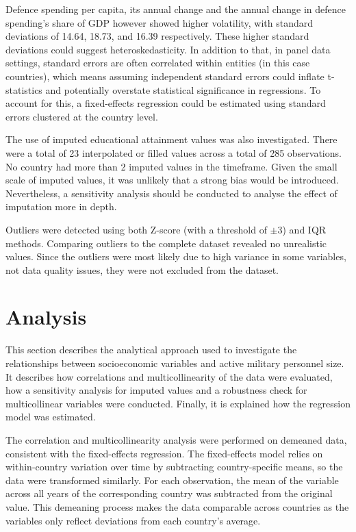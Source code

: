 Defence spending per capita, its annual change and the annual change in defence spending's 
share of GDP however showed higher volatility, with standard deviations of 14.64, 18.73, and 
16.39 respectively. These higher standard deviations could suggest heteroskedasticity. In addition 
to that, in panel data settings, standard errors are often correlated within entities (in this case countries), 
which means assuming independent standard errors could inflate t-statistics and potentially 
overstate statistical significance in regressions. To account for this, a fixed-effects 
regression could be estimated using standard errors clustered at the country level.

The use of imputed educational attainment values was also investigated. There were a total 
of 23 interpolated or filled values across a total of 285 observations. No country had
more than 2 imputed values in the timeframe. Given the small scale of imputed values, it was 
unlikely that a strong bias would be introduced. Nevertheless, a sensitivity analysis should 
be conducted to analyse the effect of imputation more in depth.

Outliers were detected using both Z-score (with a threshold of $\pm 3$) and IQR methods. 
Comparing outliers to the complete dataset revealed no unrealistic 
values. Since the outliers were most likely due to high variance in some variables, not data 
quality issues, they were not excluded from the dataset.

\section{Analysis}

This section describes the analytical approach used to investigate the relationships between 
socioeconomic variables and active military personnel size.
It describes how correlations and multicollinearity of the data were evaluated, 
how a sensitivity analysis for imputed values and a robustness check for multicollinear 
variables were conducted. Finally, it is explained how the regression model was estimated.

The correlation and multicollinearity analysis were performed on demeaned data, consistent 
with the fixed-effects regression. The fixed-effects model relies on within-country variation 
over time by subtracting country-specific means, so the data were transformed similarly. For 
each observation, the mean of the variable across all years of the corresponding country was 
subtracted from the original value. This demeaning process makes the data comparable across 
countries as the variables only reflect deviations from each country's average. 

